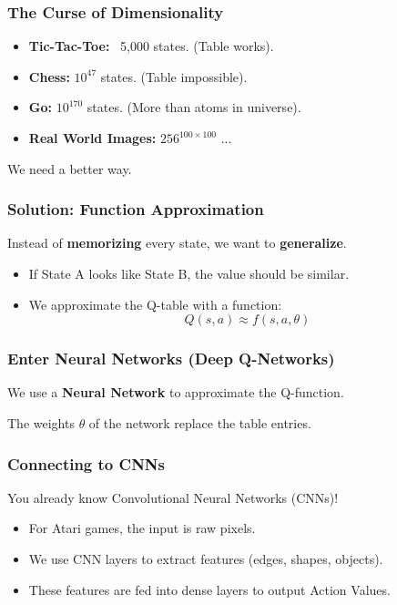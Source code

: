\documentclass[aspectratio=169]{beamer}
\begin{document}
\begin{frame}
    \frametitle{The Curse of Dimensionality}
    \begin{itemize}
        \item \textbf{Tic-Tac-Toe:} ~5,000 states. (Table works).
        \item \textbf{Chess:} $10^{47}$ states. (Table impossible).
        \item \textbf{Go:} $10^{170}$ states. (More than atoms in universe).
        \item \textbf{Real World Images:} $256^{100 \times 100}$ ...
    \end{itemize}
    We need a better way.
\end{frame}

\begin{frame}
    \frametitle{Solution: Function Approximation}
    Instead of \textbf{memorizing} every state, we want to \textbf{generalize}.
    \vspace{0.5cm}
    \begin{itemize}
        \item If State A looks like State B, the value should be similar.
        \item We approximate the Q-table with a function:
        $$ Q(s, a) \approx f(s, a, \theta) $$
    \end{itemize}
\end{frame}

\begin{frame}
    \frametitle{Enter Neural Networks (Deep Q-Networks)}
    We use a \textbf{Neural Network} to approximate the Q-function.
    \vspace{0.5cm}
    \begin{center}
    \end{center}
    The weights $\theta$ of the network replace the table entries.
\end{frame}

\begin{frame}
    \frametitle{Connecting to CNNs}
    You already know Convolutional Neural Networks (CNNs)!
    \begin{itemize}
        \item For Atari games, the input is raw pixels.
        \item We use CNN layers to extract features (edges, shapes, objects).
        \item These features are fed into dense layers to output Action Values.
    \end{itemize}
\end{frame}
\end{document}
